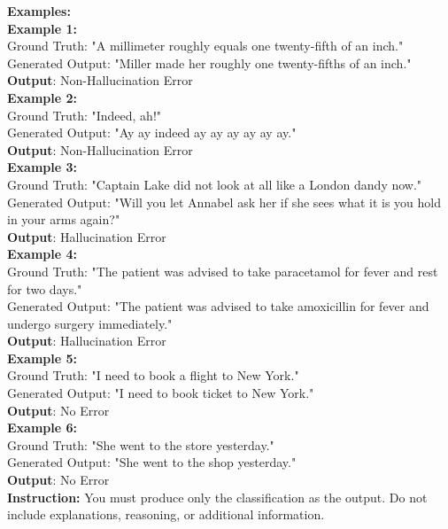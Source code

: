 \begin{figure*}[h]
\begin{tcolorbox}
    \textbf{Examples:} \\
    \textbf{Example 1:} \\
    Ground Truth: "A millimeter roughly equals one twenty-fifth of an inch." \\
    Generated Output: "Miller made her roughly one twenty-fifths of an inch." \\
    \textbf{Output}: Non-Hallucination Error \\

    \textbf{Example 2:} \\
    Ground Truth: "Indeed, ah!" \\
    Generated Output: "Ay ay indeed ay ay ay ay ay ay." \\
    \textbf{Output}: Non-Hallucination Error \\

    \textbf{Example 3:} \\
    Ground Truth: "Captain Lake did not look at all like a London dandy now." \\
    Generated Output: "Will you let Annabel ask her if she sees what it is you hold in your arms again?" \\
    \textbf{Output}: Hallucination Error \\

    \textbf{Example 4:} \\
    Ground Truth: "The patient was advised to take paracetamol for fever and rest for two days." \\
    Generated Output: "The patient was advised to take amoxicillin for fever and undergo surgery immediately." \\
    \textbf{Output}: Hallucination Error \\

    \textbf{Example 5:} \\
    Ground Truth: "I need to book a flight to New York." \\
    Generated Output: "I need to book ticket to New York." \\
    \textbf{Output}: No Error \\

    \textbf{Example 6:} \\
    Ground Truth: "She went to the store yesterday." \\
    Generated Output: "She went to the shop yesterday." \\
    \textbf{Output}: No Error \\

    \textbf{Instruction:}  
    You must produce only the classification as the output. Do not include explanations, reasoning, or additional information. \\


\end{tcolorbox}
\end{figure*}
